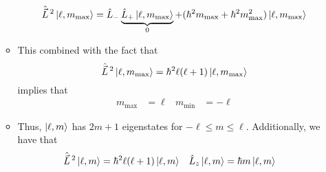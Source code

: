 \documentclass[../notes.tex]{subfiles}
\begin{document}
\begin{itemize}
\begin{itemize}
\begin{equation*}
            \hat{\vec{L}}{\,}^2\ket{\ell,m_\text{max}} = \hat{L}_-\underbrace{\hat{L}_+\ket{\ell,m_\text{max}}}_0+(\hbar^2m_\text{max}+\hbar^2m_\text{max}^2)\ket{\ell,m_\text{max}}
        \end{equation*}
        \item This combined with the fact that
        \begin{equation*}
            \hat{\vec{L}}{\,}^2\ket{\ell,m_\text{max}} = \hbar^2\ell(\ell+1)\ket{\ell,m_\text{max}}
        \end{equation*}
        implies that
        \begin{align*}
            m_\text{max} &= \ell&
            m_\text{min} &= -\ell
        \end{align*}
        \item Thus, $\ket{\ell,m}$ has $2m+1$ eigenstates for $-\ell\leq m\leq\ell$. Additionally, we have that
        \begin{align*}
            \hat{\vec{L}}{\,}^2\ket{\ell,m} &= \hbar^2\ell(\ell+1)\ket{\ell,m}&
            \hat{L}_z\ket{\ell,m} &= \hbar m\ket{\ell,m}
        \end{align*}
    \end{itemize}
\end{itemize}
\end{document}
